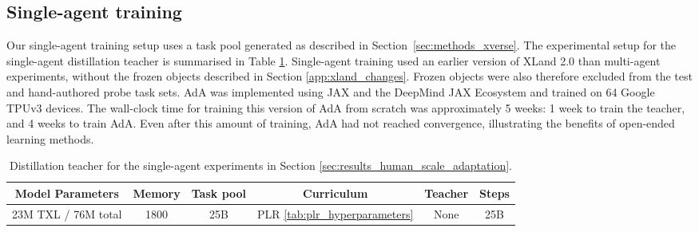 \documentclass[11pt, a4paper, logo, copyright]{deepmind}
\begin{document}
\begin{appendix}
\subsection{Single-agent training}
\label{app:single_agent_training}
Our single-agent training setup uses a task pool generated as described in Section~\ref{sec:methods_xverse}. The experimental setup for the single-agent distillation teacher is summarised in Table \ref{tab:single-agent-teacher}. Single-agent training used an earlier version of XLand 2.0 than multi-agent experiments, without the frozen objects described in Section \ref{app:xland_changes}. Frozen objects were also therefore excluded from the test and hand-authored probe task sets. AdA was implemented using JAX \citep{jax2018github} and the DeepMind JAX Ecosystem \citep{deepmind2020jax} and trained on 64 Google TPUv3 devices. The wall-clock time for training this version of AdA from scratch was approximately 5 weeks: 1 week to train the teacher, and 4 weeks to train AdA. Even after this amount of training, AdA had not reached convergence, illustrating the benefits of open-ended learning methods.
\begin{table}[h!]
  \begin{center}
    \caption{Distillation teacher for the single-agent experiments in Section \ref{sec:results_human_scale_adaptation}.}
    \begin{tabular}{c|c|c|c|c|c}
    \label{tab:single-agent-teacher}
      Model Parameters & Memory & Task pool & Curriculum & Teacher & Steps\\
      \hline
      23M TXL / 76M total & 1800 & 25B & PLR \ref{tab:plr_hyperparameters} & None & 25B \\
    \end{tabular}
  \end{center}
\end{table}

\end{appendix}
\end{document}
